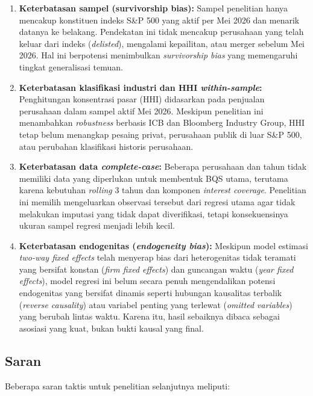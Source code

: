 \documentclass[12pt,a4paper]{article}
\providecommand{\tightlist}{%
  \setlength{\itemsep}{0pt}\setlength{\parskip}{0pt}%
}
\begin{document}
\begin{enumerate}
\def\labelenumi{\arabic{enumi}.}
\tightlist
\item
  \textbf{Keterbatasan sampel (survivorship bias):} Sampel penelitian
  hanya mencakup konstituen indeks S\&P 500 yang aktif per Mei 2026 dan
  menarik datanya ke belakang. Pendekatan ini tidak mencakup perusahaan
  yang telah keluar dari indeks (\emph{delisted}), mengalami kepailitan,
  atau merger sebelum Mei 2026. Hal ini berpotensi menimbulkan
  \emph{survivorship bias} yang memengaruhi tingkat generalisasi temuan.
\item
  \textbf{Keterbatasan klasifikasi industri dan HHI
  \emph{within-sample}:} Penghitungan konsentrasi pasar (HHI) didasarkan
  pada penjualan perusahaan dalam sampel aktif Mei 2026. Meskipun
  penelitian ini menambahkan \emph{robustness} berbasis ICB dan
  Bloomberg Industry Group, HHI tetap belum menangkap pesaing privat,
  perusahaan publik di luar S\&P 500, atau perubahan klasifikasi
  historis perusahaan.
\item
  \textbf{Keterbatasan data \emph{complete-case}:} Beberapa perusahaan
  dan tahun tidak memiliki data yang diperlukan untuk membentuk BQS
  utama, terutama karena kebutuhan \emph{rolling} 3 tahun dan komponen
  \emph{interest coverage}. Penelitian ini memilih mengeluarkan
  observasi tersebut dari regresi utama agar tidak melakukan imputasi
  yang tidak dapat diverifikasi, tetapi konsekuensinya ukuran sampel
  regresi menjadi lebih kecil.
\item
  \textbf{Keterbatasan endogenitas (\emph{endogeneity bias}):} Meskipun
  model estimasi \emph{two-way fixed effects} telah menyerap bias dari
  heterogenitas tidak teramati yang bersifat konstan (\emph{firm fixed
  effects}) dan guncangan waktu (\emph{year fixed effects}), model
  regresi ini belum secara penuh mengendalikan potensi endogenitas yang
  bersifat dinamis seperti hubungan kausalitas terbalik (\emph{reverse
  causality}) atau variabel penting yang terlewat (\emph{omitted
  variables}) yang berubah lintas waktu. Karena itu, hasil sebaiknya
  dibaca sebagai asosiasi yang kuat, bukan bukti kausal yang final.
\end{enumerate}

\subsection{Saran}\label{saran}

Beberapa saran taktis untuk penelitian selanjutnya meliputi:
\end{document}
